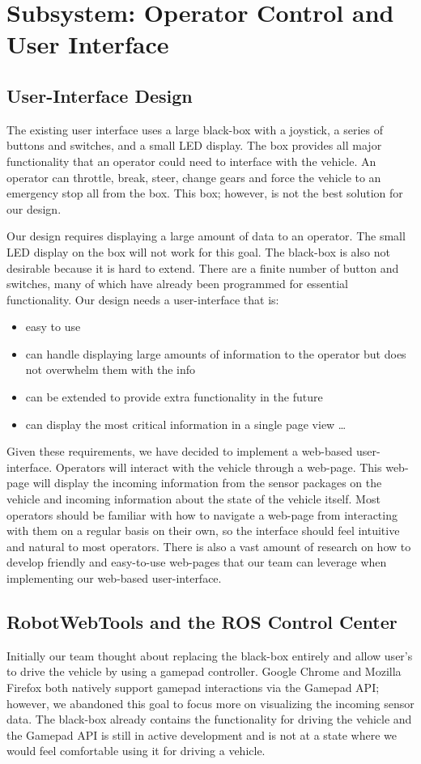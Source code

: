\chapter{Subsystem: Operator Control and User Interface}

\section{User-Interface Design} The existing user interface uses a large black-box with a joystick, a series of buttons and switches, and a small LED display.  The box provides all major functionality that an operator could need to interface with the vehicle.  An operator can throttle, break, steer, change gears and force the vehicle to an emergency stop all from the box.  This box; however, is not the best solution for our design.

Our design requires displaying a large amount of data to an operator.  The small LED display on the box will not work for this goal.  The black-box is also not desirable because it is hard to extend.  There are a finite number of button and switches, many of which have already been programmed for essential functionality.  Our design needs a user-interface that is:
\begin{itemize}
	\item easy to use
    \item can handle displaying large amounts of information to the operator but does not overwhelm them with the info
    \item can be extended to provide extra functionality in the future 
    \item can display the most critical information in a single page view
    \ldots
\end{itemize}
  
Given these requirements, we have decided to implement a web-based user-interface.  Operators will interact with the vehicle through a web-page.  This web-page will display the incoming information from the sensor packages on the vehicle and incoming information about the state of the vehicle itself.  Most operators should be familiar with how to navigate a web-page from interacting with them on a regular basis on their own, so the interface should feel intuitive and natural to most operators.  There is also a vast amount of research on how to develop friendly and easy-to-use web-pages that our team can leverage when implementing our web-based user-interface.

\section{RobotWebTools and the ROS Control Center}Initially our team thought about replacing the black-box entirely and allow user's to drive the vehicle by using a gamepad controller.  Google Chrome and Mozilla Firefox both natively support gamepad interactions via the Gamepad API; however, we abandoned this goal to focus more on visualizing the incoming sensor data.  The black-box already contains the functionality for driving the vehicle and the Gamepad API is still in active development and is not at a state where we would feel comfortable using it for driving a vehicle.

